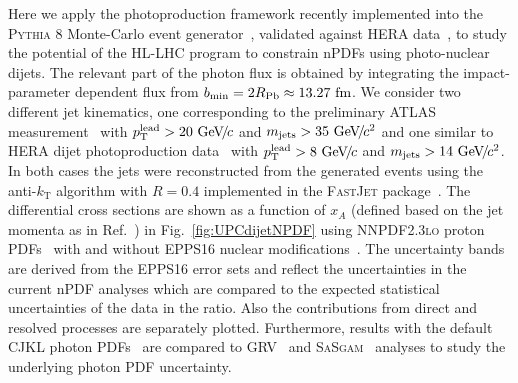 \documentclass[../report.tex]{subfiles}
\begin{document}
Here we apply the photoproduction framework recently implemented into the \textsc{Pythia 8} Monte-Carlo event generator~\cite{Sjostrand:2014zea}, validated against HERA data~\cite{Helenius:2018bai}, to study the potential of the HL-LHC program to constrain nPDFs using photo-nuclear dijets. The relevant part of the photon flux is obtained by integrating the impact-parameter dependent flux from $b_{\mathrm{min}}=2 R_{\mathrm{Pb}} \approx 13.27~\text{fm}$. We consider two different jet kinematics, one corresponding to the preliminary ATLAS measurement~\cite{ATLAS:2017kwa} with $p\sb{\scriptstyle\mathrm{T}}^{\mathrm{lead}}>20~\text{GeV}\!/\mspace{-2mu}c$ and $m_{\mathrm{jets}} > 35~\text{GeV}\!/\mspace{-2mu}c^2$ and one similar to HERA dijet photoproduction data~\cite{Derrick:1996zy,Adloff:2000bs} with $p\sb{\scriptstyle\mathrm{T}}^{\mathrm{lead}}>8~\text{GeV}\!/\mspace{-2mu}c$ and $m_{\mathrm{jets}} > 14~\text{GeV}\!/\mspace{-2mu}c^2$. In both cases the jets were reconstructed from the generated events using the anti-$k_{\mathrm{T}}$ algorithm with $R = 0.4$ implemented in the \textsc{FastJet} package~\cite{Cacciari:2011ma}. The differential cross sections are shown as a function of $x_A$ (defined based on the jet momenta as in Ref.~\cite{ATLAS:2017kwa}) in Fig.~\ref{fig:UPCdijetNPDF} using \textsc{NNPDF2.3lo} proton PDFs~\cite{Ball:2012cx} with and without EPPS16 nuclear modifications~\cite{Eskola:2016oht}. The uncertainty bands are derived from the EPPS16 error sets and reflect the uncertainties in the current nPDF analyses which are compared to the expected statistical uncertainties of the data in the ratio. Also the contributions from direct and resolved processes are separately plotted. Furthermore, results with the default CJKL photon PDFs~\cite{Cornet:2002iy} are compared to GRV~\cite{Gluck:1991jc} and \textsc{SaSgam}~\cite{Schuler:1995fk} analyses to study the underlying photon PDF uncertainty.
\end{document}
